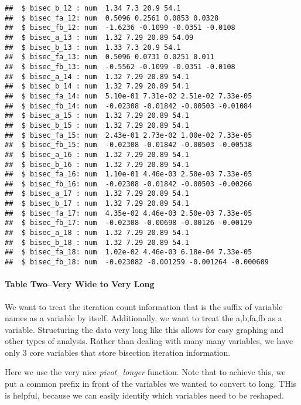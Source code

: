\documentclass[
]{book}
\begin{document}
\begin{verbatim}
##  $ bisec_b_12 : num  1.34 7.3 20.9 54.1
##  $ bisec_fa_12: num  0.5096 0.2561 0.0853 0.0328
##  $ bisec_fb_12: num  -1.6236 -0.1099 -0.0351 -0.0108
##  $ bisec_a_13 : num  1.32 7.29 20.89 54.09
##  $ bisec_b_13 : num  1.33 7.3 20.9 54.1
##  $ bisec_fa_13: num  0.5096 0.0731 0.0251 0.011
##  $ bisec_fb_13: num  -0.5562 -0.1099 -0.0351 -0.0108
##  $ bisec_a_14 : num  1.32 7.29 20.89 54.1
##  $ bisec_b_14 : num  1.32 7.29 20.89 54.1
##  $ bisec_fa_14: num  5.10e-01 7.31e-02 2.51e-02 7.33e-05
##  $ bisec_fb_14: num  -0.02308 -0.01842 -0.00503 -0.01084
##  $ bisec_a_15 : num  1.32 7.29 20.89 54.1
##  $ bisec_b_15 : num  1.32 7.29 20.89 54.1
##  $ bisec_fa_15: num  2.43e-01 2.73e-02 1.00e-02 7.33e-05
##  $ bisec_fb_15: num  -0.02308 -0.01842 -0.00503 -0.00538
##  $ bisec_a_16 : num  1.32 7.29 20.89 54.1
##  $ bisec_b_16 : num  1.32 7.29 20.89 54.1
##  $ bisec_fa_16: num  1.10e-01 4.46e-03 2.50e-03 7.33e-05
##  $ bisec_fb_16: num  -0.02308 -0.01842 -0.00503 -0.00266
##  $ bisec_a_17 : num  1.32 7.29 20.89 54.1
##  $ bisec_b_17 : num  1.32 7.29 20.89 54.1
##  $ bisec_fa_17: num  4.35e-02 4.46e-03 2.50e-03 7.33e-05
##  $ bisec_fb_17: num  -0.02308 -0.00698 -0.00126 -0.00129
##  $ bisec_a_18 : num  1.32 7.29 20.89 54.1
##  $ bisec_b_18 : num  1.32 7.29 20.89 54.1
##  $ bisec_fa_18: num  1.02e-02 4.46e-03 6.18e-04 7.33e-05
##  $ bisec_fb_18: num  -0.023082 -0.001259 -0.001264 -0.000609
\end{verbatim}

\hypertarget{table-twovery-wide-to-very-long}{%
\paragraph{Table Two--Very Wide to Very Long}\label{table-twovery-wide-to-very-long}}

We want to treat the iteration count information that is the suffix of variable names as a variable by itself. Additionally, we want to treat the a,b,fa,fb as a variable. Structuring the data very long like this allows for easy graphing and other types of analysis. Rather than dealing with many many variables, we have only 3 core variables that store bisection iteration information.

Here we use the very nice \emph{pivot\_longer} function. Note that to achieve this, we put a common prefix in front of the variables we wanted to convert to long. THis is helpful, because we can easily identify which variables need to be reshaped.
\end{document}
